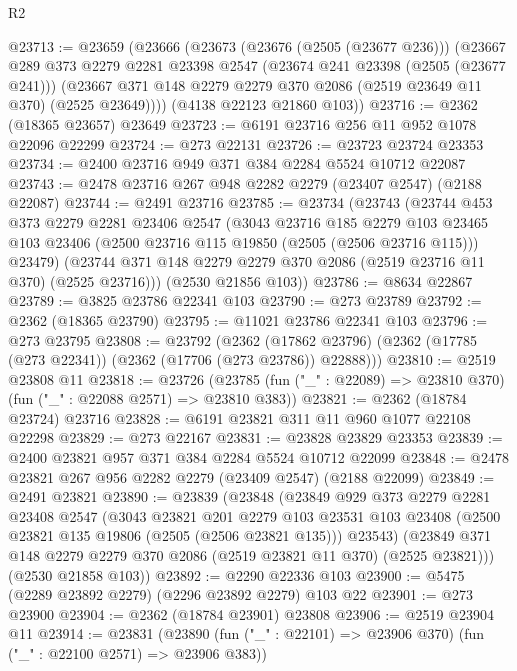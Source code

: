 \begin{lexlean}{R2}
\begin{coremodule}
@23713 := @23659
    (@23666
      (@23673
        (@23676 (@2505 (@23677 @236)))
        (@23667
          @289
          @373
          @2279
          @2281
          @23398
          @2547
          (@23674 @241 @23398 (@2505 (@23677 @241)))
          (@23667 @371 @148 @2279 @2279 @370 @2086 (@2519 @23649 @11 @370) (@2525 @23649))))
      (@4138 @22123 @21860 @103))
@23716 := @2362 (@18365 @23657) @23649
@23723 := @6191 @23716 @256 @11 @952 @1078 @22096 @22299
@23724 := @273 @22131
@23726 := @23723 @23724 @23353
@23734 := @2400 @23716 @949 @371 @384 @2284 @5524 @10712 @22087
@23743 := @2478 @23716 @267 @948 @2282 @2279 (@23407 @2547) (@2188 @22087)
@23744 := @2491 @23716
@23785 := @23734
    (@23743
      (@23744
        @453
        @373
        @2279
        @2281
        @23406
        @2547
        (@3043
          @23716
          @185
          @2279
          @103
          @23465
          @103
          @23406
          (@2500 @23716 @115 @19850 (@2505 (@2506 @23716 @115)))
          @23479)
        (@23744 @371 @148 @2279 @2279 @370 @2086 (@2519 @23716 @11 @370) (@2525 @23716)))
      (@2530 @21856 @103))
@23786 := @8634 @22867
@23789 := @3825 @23786 @22341 @103
@23790 := @273 @23789
@23792 := @2362 (@18365 @23790)
@23795 := @11021 @23786 @22341 @103
@23796 := @273 @23795
@23808 := @23792
    (@2362 (@17862 @23796) (@2362 (@17785 (@273 @22341)) (@2362 (@17706 (@273 @23786)) @22888)))
@23810 := @2519 @23808 @11
@23818 := @23726
    (@23785 (fun ("_" : @22089) => @23810 @370) (fun ("_" : @22088 @2571) => @23810 @383))
@23821 := @2362 (@18784 @23724) @23716
@23828 := @6191 @23821 @311 @11 @960 @1077 @22108 @22298
@23829 := @273 @22167
@23831 := @23828 @23829 @23353
@23839 := @2400 @23821 @957 @371 @384 @2284 @5524 @10712 @22099
@23848 := @2478 @23821 @267 @956 @2282 @2279 (@23409 @2547) (@2188 @22099)
@23849 := @2491 @23821
@23890 := @23839
    (@23848
      (@23849
        @929
        @373
        @2279
        @2281
        @23408
        @2547
        (@3043
          @23821
          @201
          @2279
          @103
          @23531
          @103
          @23408
          (@2500 @23821 @135 @19806 (@2505 (@2506 @23821 @135)))
          @23543)
        (@23849 @371 @148 @2279 @2279 @370 @2086 (@2519 @23821 @11 @370) (@2525 @23821)))
      (@2530 @21858 @103))
@23892 := @2290 @22336 @103
@23900 := @5475 (@2289 @23892 @2279) (@2296 @23892 @2279) @103 @22
@23901 := @273 @23900
@23904 := @2362 (@18784 @23901) @23808
@23906 := @2519 @23904 @11
@23914 := @23831
    (@23890 (fun ("_" : @22101) => @23906 @370) (fun ("_" : @22100 @2571) => @23906 @383))

\end{coremodule}
\end{lexlean}
